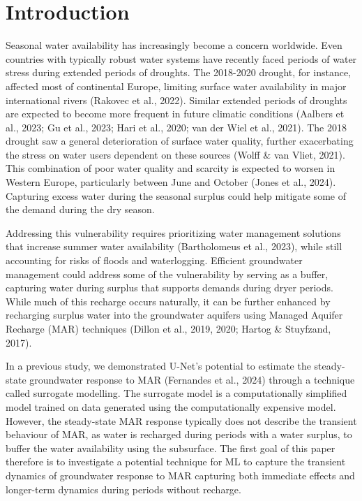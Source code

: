 \documentclass[
]{agujournal2019}
\begin{document}
\section{Introduction}\label{introduction}

Seasonal water availability has increasingly become a concern worldwide.
Even countries with typically robust water systems have recently faced
periods of water stress during extended periods of droughts. The
2018-2020 drought, for instance, affected most of continental Europe,
limiting surface water availability in major international rivers
(Rakovec et al., 2022). Similar extended periods of droughts are
expected to become more frequent in future climatic conditions (Aalbers
et al., 2023; Gu et al., 2023; Hari et al., 2020; van der Wiel et al.,
2021). The 2018 drought saw a general deterioration of surface water
quality, further exacerbating the stress on water users dependent on
these sources (Wolff \& van Vliet, 2021). This combination of poor water
quality and scarcity is expected to worsen in Western Europe,
particularly between June and October (Jones et al., 2024). Capturing
excess water during the seasonal surplus could help mitigate some of the
demand during the dry season.

Addressing this vulnerability requires prioritizing water management
solutions that increase summer water availability (Bartholomeus et al.,
2023), while still accounting for risks of floods and waterlogging.
Efficient groundwater management could address some of the vulnerability
by serving as a buffer, capturing water during surplus that supports
demands during dryer periods. While much of this recharge occurs
naturally, it can be further enhanced by recharging surplus water into
the groundwater aquifers using Managed Aquifer Recharge (MAR) techniques
(Dillon et al., 2019, 2020; Hartog \& Stuyfzand, 2017).

In a previous study, we demonstrated U-Net's potential to estimate the
steady-state groundwater response to MAR (Fernandes et al., 2024)
through a technique called surrogate modelling. The surrogate model is a
computationally simplified model trained on data generated using the
computationally expensive model. However, the steady-state MAR response
typically does not describe the transient behaviour of MAR, as water is
recharged during periods with a water surplus, to buffer the water
availability using the subsurface. The first goal of this paper
therefore is to investigate a potential technique for ML to capture the
transient dynamics of groundwater response to MAR capturing both
immediate effects and longer-term dynamics during periods without
recharge.
\end{document}
